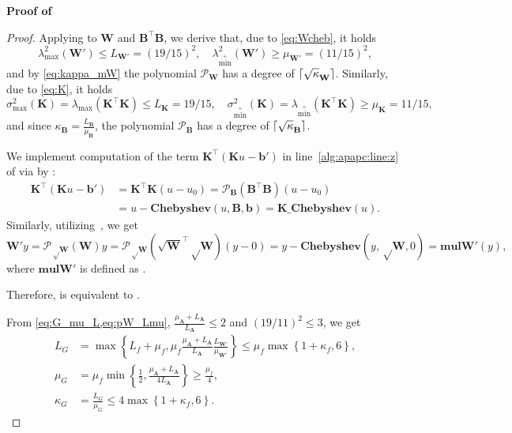 \documentclass{article}
\DeclarePairedDelimiter\ceil{\lceil}{\rceil}
\newcommand{\lmax}{\lambda_{\max}}
\newcommand{\smax}{\sigma_{\max}}
\newcommand{\sminp}{\sigma_{\min^+}}
\newcommand{\lminp}{\lambda_{\min^+}}
\newcommand{\cP}{\mathcal{P}}
\newcommand{\mA}{\mathbf{A}}
\newcommand{\mB}{\mathbf{B}}
\newcommand{\mK}{\mathbf{K}}
\newcommand{\mW}{\mathbf{W}}
\newcommand{\pW}{\mathbf{W'}}
\newcommand{\mb}{\mathbf{b}}
\newcommand{\pb}{\mathbf{b'}}
\newcommand{\mulpW}{\mathrm{\mathbf{mul}\pW}}
\newcommand{\cheb}{\mathrm{\mathbf{Chebyshev}}}
\newcommand{\Kcheb}{\mathrm{\mathbf{K\_Chebyshev}}}
\newcommand{\braces}[1]{\left\{ #1 \right\}}
\begin{document}
\textbf{Proof of }
\begin{proof}
Applying  to $\mW$ and $\mB^\top \mB$, we derive that, due to \cref{eq:Wcheb},
it holds
\begin{equation}\label{eq:pW_Lmu}
  \lmax^2(\pW) \leq L_{\pW} = (19/15)^2,
  \quad 
  \lminp^2(\pW) \geq \mu_{\pW} = (11/15)^2,
\end{equation}
and by \cref{eq:kappa_mW} the polynomial $\cP_\mW$ has a degree of $\ceil{\sqrt\kappa_\mW}$.  
Similarly, due to \cref{eq:K}, it holds 
\begin{equation}\label{eq:K_Lmu}
  \smax^2(\mK) = \lmax(\mK^\top \mK) \leq L_{\mK} = {19/15},
  \quad
  \sminp^2(\mK) = \lminp(\mK^\top \mK) \geq \mu_\mK = {11/15}, 
\end{equation}
and since $\kappa_\mB = \frac{L_\mB}{\mu_\mB}$, %
the polynomial $\cP_{\mB}$ has a degree of $\ceil{\sqrt\kappa_\mB}$.

We implement computation of the term $\mK^\top (\mK u - \pb)$ in line~\ref{alg:apapc:line:z} of  via  by :
\begin{align*}
  \mK^\top (\mK u - \pb) &= \mK^\top\mK (u - u_0) 
  = \cP_\mB(\mB^\top\mB)(u - u_0)
                       \\&= u - \cheb(u, \mB, \mb) = \Kcheb(u).
\end{align*}
Similarly, utilizing~, we get 
\begin{equation}
  \pW y = \cP_{\sqrt\mW}(\mW) y = \cP_{\sqrt\mW}(\sqrt{\mW}^\top \sqrt\mW) (y - 0) = y - \cheb(y, \sqrt\mW, 0) = \mulpW(y),
\end{equation}
where $\mulpW$ is defined as .

Therefore,  is equivalent to .

From \cref{eq:G_mu_L,eq:pW_Lmu}, $\frac{\mu_\mA + L_\mA}{L_\mA} \leq 2$ and $(19/11)^2 \leq 3$, we get
\begin{align}%
  L_G &= \max\braces{L_f + \mu_f, \mu_f\frac{\mu_\mA + L_\mA}{L_\mA}\frac{L_\pW}{\mu_\pW}} 
  \leq \mu_f\max\braces{1 + \kappa_f, 6}, \label{eq:L_G_bound}
\\
  \mu_G &= \mu_f \min\braces{\frac12, \frac{\mu_\mA + L_\mA}{4L_\mA}} \geq \frac{\mu_f}4, \label{eq:mu_G_bound}
  \\
  \kappa_G &= \frac{L_G}{\mu_G} \leq 4\max\braces{1 + \kappa_f, 6}. \label{eq:kappa_G_bound}
\end{align}


\end{proof}
\end{document}
